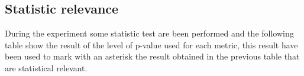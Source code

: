 \documentclass[11pt]{article}
\begin{document}
\vspace{10pt}
\begin{table}[H]
\centering
{}
\caption{Comparison between algorithms (Part 6)}
\end{table}
\hfill\break
\hfill\break



\subsection{Statistic relevance}\label{subsec:stas_rel}
During the experiment some statistic test are been performed and the following table show the result
of the level of p-value used for each metric, this result have been used to mark with an asterisk
the result obtained in the previous table that are statistical relevant.
\end{document}
